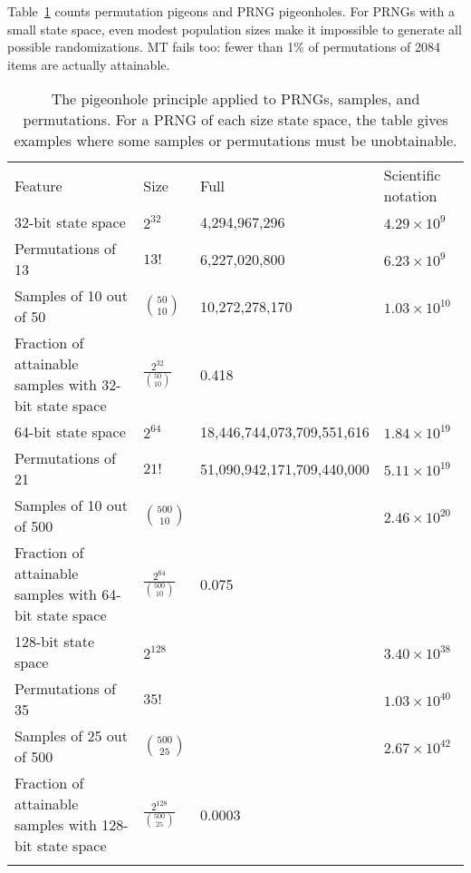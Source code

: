 \documentclass[graybox]{svmult}
\begin{document}
Table~\ref{tab:pigeonhole} counts permutation pigeons and PRNG pigeonholes.
For PRNGs with a small state space, even modest population sizes make it impossible to generate all possible randomizations.
MT fails too: fewer than 1\% of permutations of 2084 items are actually attainable.

\begin{table}
\caption{The pigeonhole principle applied to PRNGs, samples, and permutations.
For a PRNG of each size state space, the table gives examples where some samples or permutations 
must be unobtainable.}
\label{tab:pigeonhole}       
\begin{tabular}[h]{p{4cm}p{2.4cm}p{4cm}p{2cm}}
\hline\noalign{\smallskip}
Feature & Size & Full & Scientific notation  \\
\noalign{\smallskip}\svhline\noalign{\smallskip}
32-bit state space & $2^{32}$ & 4,294,967,296 & $4.29 \times 10^9$ \\
Permutations of 13 & $13!$ & 6,227,020,800 & $6.23 \times 10^9$ \\
Samples of 10 out of 50 & ${50 \choose 10}$ &  10,272,278,170 & $1.03\times 10^{10} $ \\
Fraction of attainable samples with 32-bit state space & $\frac{2^{32}}{{50 \choose 10}}$   & 0.418 & \\
\noalign{\smallskip}\svhline\noalign{\smallskip}
64-bit state space & $2^{64}$ & 18,446,744,073,709,551,616 & $1.84 \times 10^{19}$ \\
Permutations of 21 & $21!$ &  51,090,942,171,709,440,000 & $5.11 \times 10^{19}$ \\
Samples of 10 out of 500 & ${500 \choose 10}$ & & $2.46 \times 10^{20}$ \\
Fraction of attainable samples with 64-bit state space & $\frac{2^{64}}{{500 \choose 10}}$ &  0.075 & \\
\noalign{\smallskip}\svhline\noalign{\smallskip}
128-bit state space & $2^{128}$ &  & $3.40 \times 10^{38}$ \\
Permutations of 35 & $35!$ &   & $1.03 \times 10^{40}$ \\
Samples of 25 out of 500 & ${500 \choose 25}$ & & $2.67 \times 10^{42}$ \\
Fraction of attainable samples with 128-bit state space & $\frac{2^{128}}{{500 \choose 25}}$ &  0.0003 & \\
\noalign{\smallskip}\svhline\noalign{\smallskip}

\end{tabular}
\end{table}
\end{document}
